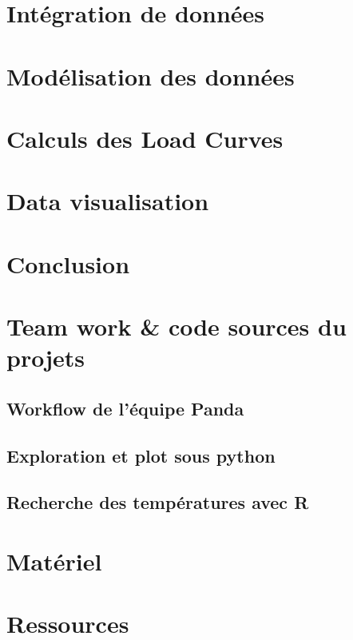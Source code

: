 \documentclass{report}
\begin{document}


\chapter{Intégration de données}



\chapter{Modélisation des données}



\chapter{Calculs des Load Curves}





\chapter{Data visualisation}



\chapter{Conclusion}

\appendix

\chapter{Team work \& code sources du projets}
\section{Workflow de l'équipe Panda}
\section{Exploration et plot sous python}
\section{Recherche des températures avec R}
\chapter{Matériel}
\chapter{Ressources}
\end{document}
